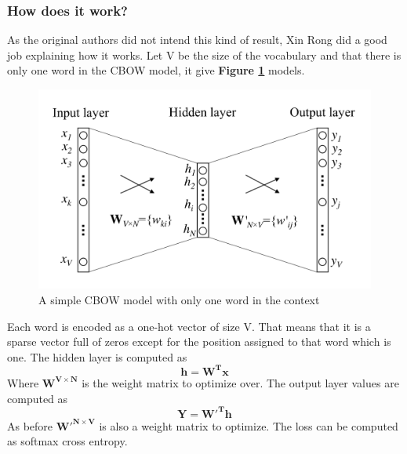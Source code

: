 \subsubsection{How does it work?} 
As the original authors did not intend this kind of result, Xin Rong\cite{Rong2014} did a good job explaining how it works. 
Let V be the size of the vocabulary and that there is only one word in the CBOW model, it give \textbf{Figure \ref{fig:chap4:CBOW}} models. 
\begin{figure}
 \centering
 \includegraphics[width=\textwidth]{images/chapitre4/CBOW}
 \caption{A simple CBOW model with only one word in the context}
 \label{fig:chap4:CBOW}
\end{figure}
Each word is encoded as a one-hot vector of size V. That means that it is a sparse vector full of zeros except for the position assigned to that word which is one. The hidden layer is computed as 
\begin{equation}
 \mathbf{h} = \mathbf{W^Tx}
\end{equation}
Where $\mathbf{W^{V \times N}}$ is the weight matrix to optimize over. 
The output layer values are computed as 
\begin{equation}
 \mathbf{Y} = \mathbf{W'^Th}
\end{equation}
As before $\mathbf{W'^{N \times V}}$ is also a weight matrix to optimize. The loss can be computed as softmax cross entropy. \\

